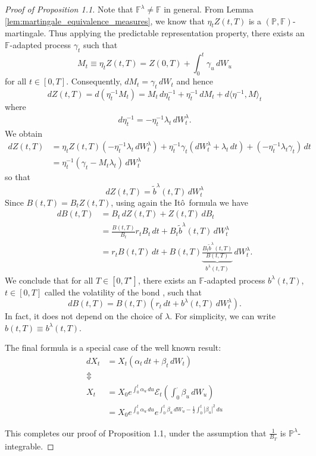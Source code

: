 \documentclass[10pt, oneside, reqno]{amsbook}
\theoremstyle{plain}%
\theoremstyle{definition}
\theoremstyle{rem}
\theoremstyle{definition}
\def \P {\ensuremath{\mathcal{P}}}
\newcommand{\Q}{\mathbb{Q}}
\renewcommand{\P}{\mathbb{P}}
\newcommand{\F}{\mathbb{F}}
\newcommand{\ito}{It\^o\ }
\newcommand{\doleans}[1]{\mathcal E_t \left(\int_0^\cdot #1 \right)}
\numberwithin{equation}{chapter}
\begin{document}
\begin{proof}[Proof of Proposition 1.1]
    Note that $\F^{\lambda} \neq \F$ in general.  From Lemma \ref{lem:martingale_equivalence_measures}, we know that $\eta_t Z(t, T)$ is a $(\P, \F)$-martingale.  Thus applying the predictable representation property, there exists an $\F$-adapted process $\gamma_t$ such that \[
        M_t \equiv \eta_t Z(t, T) = Z(0, T) + \int_0^t \gamma_u \, dW_u
    \] for all $t \in [0, T]$.  Consequently, $dM_t = \gamma_t \, dW_t$ and hence \[
        dZ(t, T) = d(\eta^{-1}_t M_t) = M_t \, d\eta_t^{-1} + \eta_t^{-1}\, dM_t + d \langle \eta^{-1}, M \rangle_t
    \]  where \begin{align*}
        d \eta_t^{-1} = - \eta_t^{-1} \lambda_t \, dW_t^\lambda.
    \end{align*}  We obtain \begin{align*}
        dZ(t, T) &= \eta_t Z(t, T) \left( - \eta_t^{-1} \lambda_t \, dW_t^\lambda \right) + \eta_t^{-1} \gamma_t \left(dW_t^\lambda + \lambda_t \, dt \right) + \left(- \eta_t^{-1} \lambda_t \gamma_t \right) \, dt \\
        &= \eta_t^{-1} \left(\gamma_t - M_t \lambda_t \right) \, dW_t^\lambda
    \end{align*} so that \[
        dZ(t, T) = \tilde b^\lambda(t, T) \, dW_t^\lambda
    \]  Since $B(t, T) = B_t Z(t, T)$, using again the \ito formula we have \begin{align*}
        dB(t, T)    &= B_t \, dZ(t, T) + Z(t, T) \, dB_t  \\
                    &= \frac{B(t, T)}{B_t} r_t B_t \, dt + B_t \tilde b^\lambda(t, T) \, dW_t^\lambda \\
                    &= r_t B(t, T) \, dt + B(t, T) \underbrace{\frac{B_t \tilde b^\lambda(t, T)}{B(t, T)}}_{b^\lambda(t, T)} \, dW^\lambda_t.
    \end{align*}   We conclude that for all $T \in [0, T^\star]$, there exists an $\F$-adapted process $b^\lambda(t, T)$, $t \in [0, T]$ called the volatility of the bond
, such that \[
    dB(t, T) = B(t, T)(r_t \, dt + b^\lambda(t, T) \, dW^\lambda_t).  
\]    In fact, it does not depend on the choice of $\lambda$.  For simplicity, we can write $b(t, T) \equiv b^\lambda(t, T)$.  

The final formula is a special case of the well known result:
\begin{align*}
    dX_t    &= X_t (\alpha_t \, dt + \beta_t \, dW_t) \\
                \Updownarrow  \\
        X_t &= X_0 e^{\int_0^t \alpha_u \, du} \doleans {\beta_u \, dW_u }  \\
            &= X_0 e^{\int_0^t \alpha_u \, du} e^{\int_0^t \beta_u \, dW_u - \frac{1}{2} \int_0^t |\beta_u|^2 \, du}
        \end{align*}
        
    This completes our proof of Proposition 1.1, under the assumption that $\frac{1}{B_T}$ is $\P^\lambda$-integrable.
\end{proof}
\end{document}

